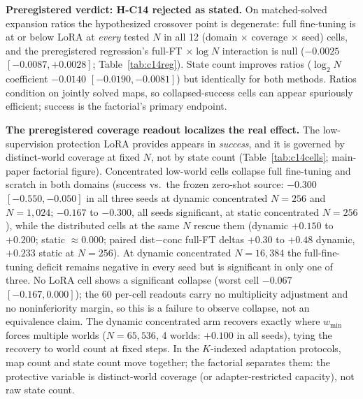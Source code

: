 \documentclass[letterpaper]{article} %
\begin{document}
\textbf{Preregistered verdict: H-C14 rejected as stated.} On matched-solved expansion ratios the hypothesized crossover point is degenerate: full fine-tuning is at or below LoRA at \emph{every} tested $N$ in all 12 (domain $\times$ coverage $\times$ seed) cells, and the preregistered regression's full-FT $\times \log N$ interaction is null ($-0.0025$ $[-0.0087, +0.0028]$; Table~\ref{tab:c14reg}). State count improves ratios ($\log_2 N$ coefficient $-0.0140$ $[-0.0190, -0.0081]$) but identically for both methods. Ratios condition on jointly solved maps, so collapsed-success cells can appear spuriously efficient; success is the factorial's primary endpoint.

\textbf{The preregistered coverage readout localizes the real effect.} The low-supervision protection LoRA provides appears in \emph{success}, and it is governed by distinct-world coverage at fixed $N$, not by state count (Table~\ref{tab:c14cells}; main-paper factorial figure). Concentrated low-world cells collapse full fine-tuning and scratch in both domains (success vs.\ the frozen zero-shot source: $-0.300$ $[-0.550,-0.050]$ in all three seeds at dynamic concentrated $N{=}256$ and $N{=}1{,}024$; $-0.167$ to $-0.300$, all seeds significant, at static concentrated $N{=}256$), while the distributed cells at the same $N$ rescue them (dynamic $+0.150$ to $+0.200$; static $\approx 0.000$; paired dist$-$conc full-FT deltas $+0.30$ to $+0.48$ dynamic, $+0.233$ static at $N{=}256$). At dynamic concentrated $N{=}16{,}384$ the full-fine-tuning deficit remains negative in every seed but is significant in only one of three. No LoRA cell shows a significant collapse (worst cell $-0.067$ $[-0.167, 0.000]$); the 60 per-cell readouts carry no multiplicity adjustment and no noninferiority margin, so this is a failure to observe collapse, not an equivalence claim. The dynamic concentrated arm recovers exactly where $w_{\min}$ forces multiple worlds ($N{=}65{,}536$, 4 worlds: $+0.100$ in all seeds), tying the recovery to world count at fixed steps. In the $K$-indexed adaptation protocols, map count and state count move together; the factorial separates them: the protective variable is distinct-world coverage (or adapter-restricted capacity), not raw state count.
\end{document}
